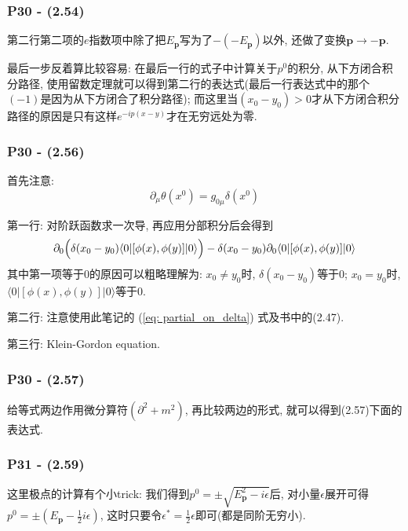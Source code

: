 \documentclass[cn,hazy,blue,11pt,device=normal,chinesefont=founder]{elegantnote}
\begin{document}
\subsubsection{P30 - (2.54)}

第二行第二项的$e$指数项中除了把$E_\mathbf{p}$写为了$-(-E_\mathbf{p})$以外, 还做了变换$\mathbf{p} \rightarrow -\mathbf{p}$. 

最后一步反着算比较容易: 在最后一行的式子中计算关于$p^0$的积分, 从下方闭合积分路径, 使用留数定理就可以得到第二行的表达式(最后一行表达式中的那个$(-1)$是因为从下方闭合了积分路径); 而这里当$(x_0 - y_0)>0$才从下方闭合积分路径的原因是只有这样$e^{-ip(x - y)}$才在无穷远处为零. 

\subsubsection{P30 - (2.56)}

首先注意: 
\begin{equation}
  \partial_\mu \theta(x^0) = g_{0\mu} \delta(x^0) \label{eq: partial_on_delta}
\end{equation}

第一行: 对阶跃函数求一次导, 再应用分部积分后会得到
\begin{equation}
  \partial_0 \Bigl(\delta(x_0 - y_0)\langle 0|[\phi(x), \phi(y)]|0\rangle \Bigr)-\delta(x_0 - y_0)\partial_0\langle 0|[\phi(x), \phi(y)]|0\rangle
\end{equation}
其中第一项等于0的原因可以粗略理解为: $x_0 \neq y_0$时, $\delta(x_0 - y_0)$等于0; $x_0 = y_0$时, $\langle 0|[\phi(x), \phi(y)]|0\rangle$等于0. 

第二行: 注意使用此笔记的 (\ref{eq: partial_on_delta}) 式及书中的(2.47). 

第三行: Klein-Gordon equation. 

\subsubsection{P30 - (2.57)}

给等式两边作用微分算符$(\partial^2 + m^2)$, 再比较两边的形式, 就可以得到(2.57)下面的表达式. 

\subsubsection{P31 - (2.59)}

这里极点的计算有个小trick: 我们得到$p^0 = \pm\sqrt{E_\mathbf{p}^2 - i\epsilon}$后, 对小量$\epsilon$展开可得$p^0 = \pm (E_\mathbf{p} - \frac{1}{2}i\epsilon)$, 这时只要令$\epsilon^* = \frac{1}{2}\epsilon$即可(都是同阶无穷小). 
\end{document}
